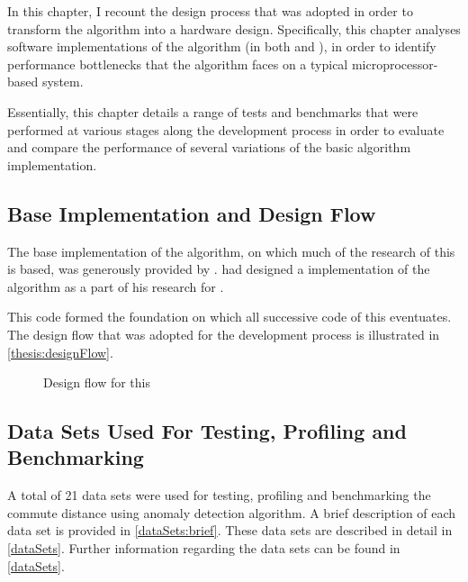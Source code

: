 In this chapter, I recount the design process that was adopted in order to
transform the  algorithm into a
hardware design. Specifically, this chapter analyses software implementations of
the algorithm (in both  and ), in order to identify
performance bottlenecks that the algorithm faces on a typical
microprocessor-based system.

Essentially, this chapter details a range of tests and benchmarks that were
performed at various stages along the development process in order to evaluate
and compare the performance of several variations of the basic algorithm
implementation.

\subsection{Base Implementation and Design Flow}
\label{software:baseImplementation}
The base implementation of the 
algorithm, on which much of the research of this \thesis{} is based, was
generously provided by . \citeauthor{Khoa:2012} had designed a
 implementation of the algorithm as a part of his research for
 \cite{Khoa:2012}.

This  code formed the foundation on which all successive code
of this \thesis{} eventuates. The design flow that was adopted for the
development process is illustrated in \autoref{thesis:designFlow}.

\begin{figure}
    \centering
    
    \caption{Design flow for this \thesis{}}
    \label{thesis:designFlow}
\end{figure}

\subsection{Data Sets Used For Testing, Profiling and Benchmarking}
\label{software:datasets}
A total of 21 data sets were used for testing, profiling and benchmarking the
commute distance using anomaly detection algorithm. A brief description of each
data set is provided in \autoref{dataSets:brief}. These data sets are
described in detail in \autoref{dataSets}. Further information regarding the
data sets can be found in \autoref{dataSets}.

